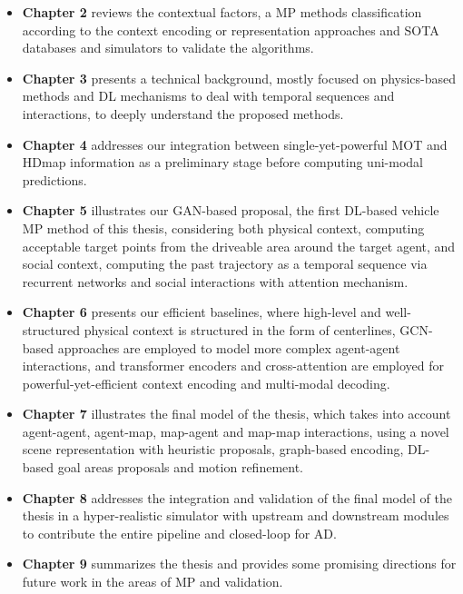 \begin{itemize}
	
	\item \textbf{Chapter 2} reviews the contextual factors, a \ac{MP} methods classification according to the context encoding or representation approaches and \ac{SOTA} databases and simulators to validate the algorithms. 
	
	\item \textbf{Chapter 3} presents a technical background, mostly focused on physics-based methods and \ac{DL} mechanisms to deal with temporal sequences and interactions, to deeply understand the proposed methods.
	
	\item \textbf{Chapter 4} addresses our integration between single-yet-powerful \ac{MOT} and \ac{HDmap} information as a preliminary stage before computing uni-modal predictions.
	
	\item \textbf{Chapter 5} illustrates our \ac{GAN}-based proposal, the first \ac{DL}-based vehicle \ac{MP} method of this thesis, considering both physical context, computing acceptable target points from the driveable area around the target agent, and social context, computing the past trajectory as a temporal sequence via recurrent networks and social interactions with attention mechanism.
	
	\item \textbf{Chapter 6} presents our efficient baselines, where high-level and well-structured physical context is structured in the form of centerlines, \ac{GCN}-based approaches are employed to model more complex agent-agent interactions, and transformer encoders and cross-attention are employed for powerful-yet-efficient context encoding and multi-modal decoding.
	
	\item \textbf{Chapter 7} illustrates the final model of the thesis, which takes into account agent-agent, agent-map, map-agent and map-map interactions, using a novel scene representation with heuristic proposals, graph-based encoding, \ac{DL}-based goal areas proposals and motion refinement.
	
	\item \textbf{Chapter 8} addresses the integration and validation of the final model of the thesis in a hyper-realistic simulator with upstream and downstream modules to contribute the entire pipeline and closed-loop for \ac{AD}.
	
	\item \textbf{Chapter 9} summarizes the thesis and provides some promising directions for future work in the areas of \ac{MP} and validation.
	
\end{itemize}
